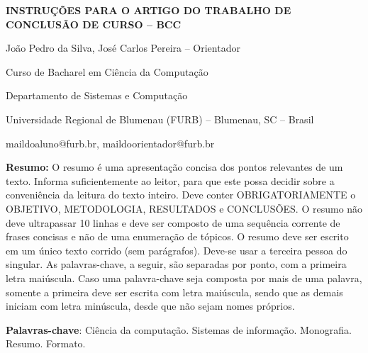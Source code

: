 \documentclass[10pt,oneside,a4paper]{article}
\begin{document}
\begin{center}
\textbf{INSTRUÇÕES PARA O ARTIGO DO TRABALHO DE CONCLUSÃO DE CURSO -- BCC}

\vspace{0.4cm}
João Pedro da Silva, José Carlos Pereira -- Orientador

Curso de Bacharel em Ciência da Computação

Departamento de Sistemas e Computação

Universidade Regional de Blumenau (FURB) -- Blumenau, SC -- Brasil

maildoaluno@furb.br, maildoorientador@furb.br
\end{center}

\noindent\textbf{Resumo:} O resumo é uma apresentação concisa dos pontos relevantes de
um texto. Informa suficientemente ao leitor, para que este possa decidir
sobre a conveniência da leitura do texto inteiro. Deve conter
OBRIGATORIAMENTE o OBJETIVO, METODOLOGIA, RESULTADOS e CONCLUSÕES. O
resumo não deve ultrapassar 10 linhas e deve ser composto de uma
sequência corrente de frases concisas e não de uma enumeração de
tópicos. O resumo deve ser escrito em um único texto corrido (sem
parágrafos). Deve-se usar a terceira pessoa do singular. As
palavras-chave, a seguir, são separadas por ponto, com a primeira letra
maiúscula. Caso uma palavra-chave seja composta por mais de uma palavra,
somente a primeira deve ser escrita com letra maiúscula, sendo que as
demais iniciam com letra minúscula, desde que não sejam nomes próprios.

\noindent\textbf{Palavras-chave}: Ciência da computação. Sistemas de informação.
Monografia. Resumo. Formato.








\appendix
\renewcommand{\thesection}{Apêndice \Alph{section}}


\end{document}
